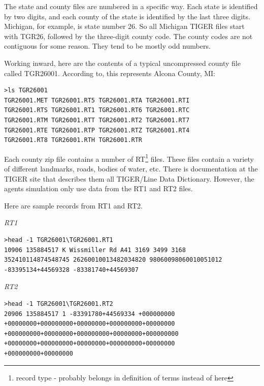 \documentclass[11pt,letterpaper,onecolumn,twoside,openright,draft]{report}
\begin{document}
The state and county files are numbered in a specific way.
Each state is identified by two digits, and each county of the state is identified by the last three digits.
Michigan, for example, is state number 26.
So all Michigan TIGER files start with TGR26, followed by the three-digit county code.
The county codes are not contiguous for some reason.
They tend to be mostly odd numbers.

Working inward, here are the contents of a typical uncompressed county file called TGR26001.
According to, this represents Alcona County, MI:


\begin{verbatim}
>ls TGR26001
TGR26001.MET TGR26001.RT5 TGR26001.RTA TGR26001.RTI
TGR26001.RTS TGR26001.RT1 TGR26001.RT6 TGR26001.RTC
TGR26001.RTM TGR26001.RTT TGR26001.RT2 TGR26001.RT7
TGR26001.RTE TGR26001.RTP TGR26001.RTZ TGR26001.RT4
TGR26001.RT8 TGR26001.RTH TGR26001.RTR
\end{verbatim}


Each county zip file contains a number of RT\footnote{record type - probably belongs in definition of terms instead of here} files.
These files contain a variety of different landmarks, roads, bodies of water, etc.
There is documentation at the TIGER site that describes them all TIGER/Line Data Dictionary.
However, the agents simulation only use data from the RT1 and RT2 files.

Here are sample records from RT1 and RT2.

\emph{RT1}
\begin{verbatim}
>head -1 TGR26001\TGR26001.RT1
10906 135884517 K Wissmiller Rd A41 3169 3499 3168
352410114874548745 26260010013482034820 98060098060010051012
-83395134+44569328 -83381740+44569307
\end{verbatim}

\emph{RT2}
\begin{verbatim}
>head -1 TGR26001\TGR26001.RT2
20906 135884517 1 -83391780+44569334 +000000000
+00000000+000000000+00000000+000000000+00000000
+000000000+00000000+000000000+00000000+000000000
+00000000+000000000+00000000+000000000+00000000
+000000000+00000000
\end{verbatim}
\end{document}
